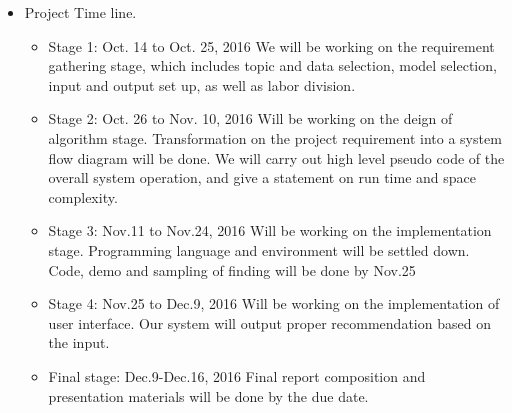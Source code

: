 \begin{itemize}
\item{Project Time line.}
	\begin{itemize}
	\item{Stage 1: Oct. 14 to Oct. 25, 2016 } 
	 We will be working on the requirement gathering stage, which includes topic and data selection, model selection, input and output set up, as well as labor division.
	 \item{Stage 2: Oct. 26 to Nov. 10, 2016 }
	 Will be working on the deign of algorithm stage. Transformation on the project requirement into a system flow diagram will be done. We will carry out high level pseudo code of the overall system operation, and give a statement on run time and space complexity. 	
	 \item{Stage 3: Nov.11 to Nov.24, 2016}
	 Will be working on the implementation stage. Programming language and environment will be settled down. Code, demo and sampling of  finding will be done by Nov.25
	 \item{Stage 4: Nov.25 to Dec.9, 2016}
	 Will be working on the implementation of user interface. Our system will output proper recommendation based on the input.
	 \item{Final stage: Dec.9-Dec.16, 2016}
	 Final report composition and presentation materials will be done by the due date.
	\end{itemize}
	
 

\end{itemize}
